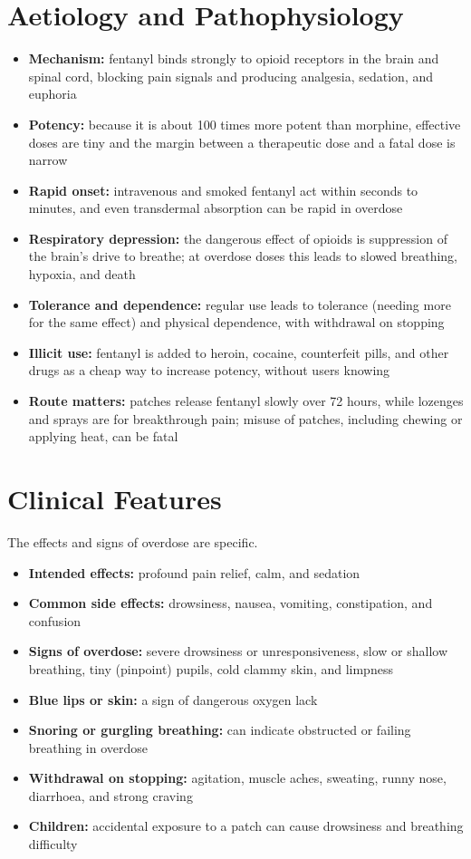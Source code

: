 \section*{Aetiology and Pathophysiology}
\begin{itemize}
    \item \textbf{Mechanism:} fentanyl binds strongly to opioid receptors in the brain and spinal cord, blocking pain signals and producing analgesia, sedation, and euphoria
    \item \textbf{Potency:} because it is about 100 times more potent than morphine, effective doses are tiny and the margin between a therapeutic dose and a fatal dose is narrow
    \item \textbf{Rapid onset:} intravenous and smoked fentanyl act within seconds to minutes, and even transdermal absorption can be rapid in overdose
    \item \textbf{Respiratory depression:} the dangerous effect of opioids is suppression of the brain's drive to breathe; at overdose doses this leads to slowed breathing, hypoxia, and death
    \item \textbf{Tolerance and dependence:} regular use leads to tolerance (needing more for the same effect) and physical dependence, with withdrawal on stopping
    \item \textbf{Illicit use:} fentanyl is added to heroin, cocaine, counterfeit pills, and other drugs as a cheap way to increase potency, without users knowing
    \item \textbf{Route matters:} patches release fentanyl slowly over 72 hours, while lozenges and sprays are for breakthrough pain; misuse of patches, including chewing or applying heat, can be fatal
\end{itemize}

\section*{Clinical Features}
The effects and signs of overdose are specific.
\begin{itemize}
    \item \textbf{Intended effects:} profound pain relief, calm, and sedation
    \item \textbf{Common side effects:} drowsiness, nausea, vomiting, constipation, and confusion
    \item \textbf{Signs of overdose:} severe drowsiness or unresponsiveness, slow or shallow breathing, tiny (pinpoint) pupils, cold clammy skin, and limpness
    \item \textbf{Blue lips or skin:} a sign of dangerous oxygen lack
    \item \textbf{Snoring or gurgling breathing:} can indicate obstructed or failing breathing in overdose
    \item \textbf{Withdrawal on stopping:} agitation, muscle aches, sweating, runny nose, diarrhoea, and strong craving
    \item \textbf{Children:} accidental exposure to a patch can cause drowsiness and breathing difficulty
\end{itemize}

